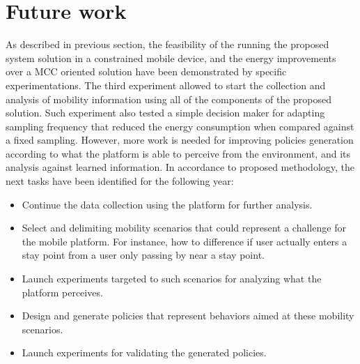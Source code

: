 \documentclass[ENG,PhD]{cinvestav}
\begin{document}
 
%                                                                                               
\section{Future work}\label{sec:future-work}
As described in previous section, the feasibility of the running the proposed system solution in a constrained mobile device, and the energy improvements over a MCC oriented solution have been demonstrated by specific experimentations.
The third experiment allowed to start the collection and analysis of mobility information using all of the components of the proposed solution.
Such experiment also tested a simple decision maker for adapting sampling frequency that reduced the energy consumption when compared against a fixed sampling.
However, more work is needed for improving policies generation according to what the platform is able to perceive from the environment, and its analysis against learned information.
In accordance to proposed methodology, the next tasks have been identified for the following year:
\begin{itemize}
  \item Continue the data collection using the platform for further analysis.
  \item Select and delimiting mobility scenarios that could represent a challenge for the mobile platform.
  For instance, how to difference if user actually enters a stay point from a user only passing by near a stay point.
  \item Launch experiments targeted to such scenarios for analyzing what the platform perceives.
  \item Design and generate policies that represent behaviors aimed at these mobility scenarios.
  \item Launch experiments for validating the generated policies.
\end{itemize}
\end{document}
